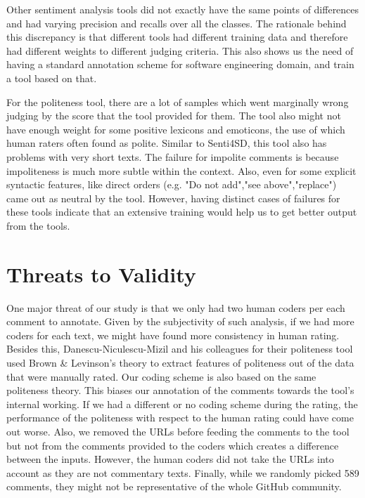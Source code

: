 Other sentiment analysis tools did not exactly have the same points of differences and had varying precision and recalls over all the classes. The rationale behind this discrepancy is that different tools had different training data and therefore had different weights to different judging criteria. This also shows us the need of having a standard annotation scheme for software engineering domain, and train a tool based on that.

For the politeness tool, there are a lot of samples which went marginally wrong judging by the score that the tool provided for them. The tool also might not have enough weight for some positive lexicons and emoticons, the use of which human raters often found as polite. Similar to Senti4SD, this tool also has problems with very short texts. The failure for impolite comments is because impoliteness is much more subtle within the context. Also, even for some explicit syntactic features, like direct orders (e.g. "Do not add","see above","replace") came out as neutral by the tool. However, having distinct cases of failures for these tools indicate that an extensive training would help us to get better output from the tools.

\section{Threats to Validity}
One major threat of our study is that we only had two human coders per each comment to annotate. Given by the subjectivity of such analysis, if we had more coders for each text, we might have found more consistency in human rating. Besides this, Danescu-Niculescu-Mizil and his colleagues for their politeness tool used Brown \& Levinson's theory to extract features of politeness out of the data that were manually rated. Our coding scheme is also based on the same politeness theory. This biases our annotation of the comments towards the tool's internal working. If we had a different or no coding scheme during the rating, the performance of the politeness with respect to the human rating could have come out worse. 
Also, 
we removed the URLs 
before feeding the comments to the tool 
but 
not from the comments provided to the coders 
which creates a difference between the inputs.
However, 
the human coders did not take the URLs into account 
as they are not commentary texts.
Finally, while we randomly picked 589 comments, they might not be representative of the whole GitHub community.

